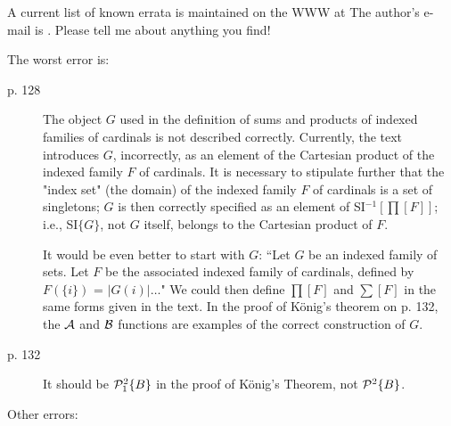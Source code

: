 \documentclass{article}
\begin{document}
\vspace{.5 cm}

A current list of known errata is maintained on the WWW at   The author's e-mail is
.  Please tell me about anything you find!

The worst error is:

\begin{description}
\item[p. 128] The object $G$ used in the definition of sums and products of
indexed families of cardinals is not described correctly.  Currently,
the text introduces $G$, incorrectly, as an element of the Cartesian
product of the indexed family $F$ of cardinals.  It is necessary to
stipulate further that the "index set" (the domain) of the indexed
family $F$ of cardinals is a set of singletons; $G$ is then correctly
specified as an element of SI$^{-1}[\prod[F]]$; i.e., SI$\{G\}$, not $G$
itself, belongs to the Cartesian product of $F$.  

It would be even better to start with $G$: ``Let $G$ be an indexed
family of sets.  Let $F$ be the associated indexed family of
cardinals, defined by $F(\{i\})$ = $|G(i)|\ldots$" We could then
define $\prod[F]$ and $\sum[F]$ in the same forms given in the text.
In the proof of K\"onig's theorem on p. 132, the $\cal A$ and $\cal B$
functions are examples of the correct construction of $G$.

\item[p. 132] It should be ${\cal P}_1^2\{B\}$ in the proof of K\"onig's
Theorem, not ${\cal P}^2\{B\}$.

\end{description}

Other errors:
\end{document}
